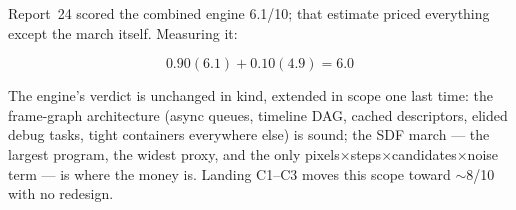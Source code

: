 \documentclass[11pt,a4paper]{article}
\begin{document}
Report~24 scored the combined engine 6.1/10; that estimate priced everything
except the march itself. Measuring it:

\begin{equation}
0.90(6.1) + 0.10(4.9) = \mathbf{6.0}
\end{equation}

The engine's verdict is unchanged in kind, extended in scope one last time:
the frame-graph architecture (async queues, timeline DAG, cached descriptors,
elided debug tasks, tight containers everywhere else) is sound; the SDF
march --- the largest program, the widest proxy, and the only
pixels$\times$steps$\times$candidates$\times$noise term --- is where the
money is. Landing C1--C3 moves this scope toward $\sim$8/10 with no
redesign.
\end{document}
